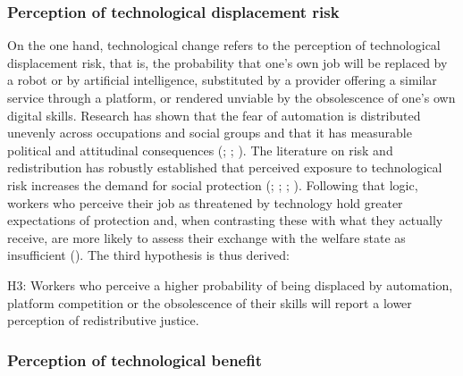 \documentclass[
  12pt,
]{article}
\begin{document}
\subsubsection{Perception of technological displacement
risk}\label{perception-of-technological-displacement-risk}

On the one hand, technological change refers to the perception of
technological displacement risk, that is, the probability that one's own
job will be replaced by a robot or by artificial intelligence,
substituted by a provider offering a similar service through a platform,
or rendered unviable by the obsolescence of one's own digital skills.
Research has shown that the fear of automation is distributed unevenly
across occupations and social groups and that it has measurable
political and attitudinal consequences
(;
;
). The literature on
risk and redistribution has robustly established that perceived exposure
to technological risk increases the demand for social protection
(;
;
;
).
Following that logic, workers who perceive their job as threatened by
technology hold greater expectations of protection and, when contrasting
these with what they actually receive, are more likely to assess their
exchange with the welfare state as insufficient
(). The third hypothesis is
thus derived:

\begin{tcolorbox}[enhanced jigsaw, arc=.35mm, bottomrule=.15mm, breakable, colback=white, colframe=quarto-callout-color-frame, left=2mm, leftrule=.75mm, opacityback=0, rightrule=.15mm, toprule=.15mm]

H3: Workers who perceive a higher probability of being displaced by
automation, platform competition or the obsolescence of their skills
will report a lower perception of redistributive justice.

\end{tcolorbox}

\subsubsection{Perception of technological
benefit}\label{perception-of-technological-benefit}
\end{document}
